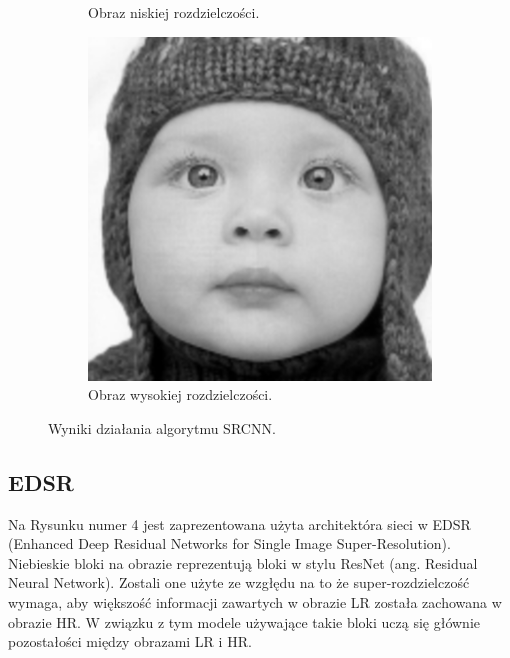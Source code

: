 \documentclass[a4paper,11pt, notitlepage ]{article}
\begin{document}
\begin{figure}[h!]
\begin{subfigure}[b]{0.4\linewidth}
	 		\caption{Obraz  niskiej rozdzielczości.}
	 	\end{subfigure}
	 	\begin{subfigure}[b]{0.4\linewidth}
	 		\includegraphics[width=\linewidth]{SRCNN_15000.png}
	 		\caption{Obraz wysokiej rozdzielczości.}
	 	\end{subfigure}
	 	\caption{Wyniki działania algorytmu SRCNN.}
	 	\label{fig:coffee3}
	 \end{figure}
 \newpage
 \subsection{EDSR}
 Na Rysunku numer 4 jest zaprezentowana użyta architektóra sieci w  EDSR (Enhanced Deep Residual Networks for Single Image Super-Resolution). Niebieskie bloki na obrazie reprezentują bloki w stylu  ResNet (ang. Residual Neural Network). Zostali one użyte ze wzgłędu na to że  super-rozdzielczość wymaga, aby większość informacji zawartych w obrazie LR została zachowana w obrazie HR. W związku z tym modele używające takie bloki uczą się głównie pozostałości między obrazami LR i HR.
  
\end{document}
